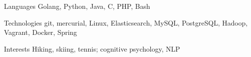 
\begin{cvskills}

  \cvskill
    {Languages} %
    {Golang, Python, Java, C, PHP, Bash} %

  \cvskill
    {Technologies} %
    {git, mercurial, Linux, Elasticsearch, MySQL, PostgreSQL, Hadoop, Vagrant, Docker, Spring} %

  \cvskill
    {Interests} %
    {Hiking, skiing, tennis; cognitive psychology, NLP} %


\end{cvskills}
